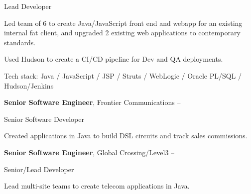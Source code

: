 \documentclass[MMMMyyyy,nonstopmode]{simpleresumecv_stacked}
\newcommand{\tech}[1]{\Gap Tech stack: #1}
\newcommand{\techsep}{/ }
\newcommand{\comment}[1]{\ignorespaces} %
\newif\ifLOCATION
\begin{document}
\begin{Body}
Lead Developer
\ifLOCATION
\hfill
Rochester, New York
\fi

\begin{Detail}
Led team of 6 to create Java/JavaScript front end and webapp for an existing internal fat client, and upgraded 2 existing web applications to contemporary standards. 

Used Hudson to create a CI/CD pipeline for Dev and QA deployments.

\tech{Java \techsep JavaScript \techsep JSP \techsep Struts \techsep WebLogic \techsep Oracle PL/SQL \techsep Hudson/Jenkins}
\end{Detail}
\fi %

\Entry
\textbf{Senior Software Engineer}, Frontier Communications
\hfill 
 -- 

Senior Software Developer
\ifLOCATION
\hfill
Rochester, New York
\fi

\begin{Detail}
Created applications in Java to build DSL circuits and track sales commissions.


\end{Detail}

\Entry
\textbf{Senior Software Engineer}, Global Crossing/Level3
\hfill 
 -- 

Senior/Lead Developer
\ifLOCATION
\hfill
Rochester, New York
\fi

\begin{Detail}
Lead multi-site teams to create telecom applications in Java.


\end{Detail}
\end{Body}
\end{document}
